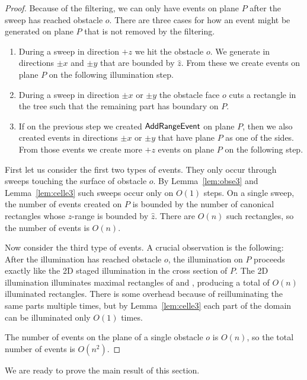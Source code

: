 \documentclass[english,gradu]{tktltiki2018}
\begin{document}
\begin{proof}
Because of the filtering, we can only have events on plane $P$ after the sweep has reached obstacle $o$.
There are three cases for how an event might be generated on plane $P$ that is not removed by the filtering.
\begin{enumerate}
\item During a sweep in direction $+z$ we hit the obstacle $o$.
	We generate \addEs in directions $\pm x$ and $\pm y$ that are bounded by $\hat{z}$.
	From these \addEs we create events on plane $P$ on the following illumination step.
\item During a sweep in direction $\pm x$ or $\pm y$ the obstacle face $o$ cuts a rectangle in the tree such that the remaining part has boundary on $P$.
\item If on the previous step we created $\mathsf{AddRangeEvent}$ on plane $P$, then we also created events in directions $\pm x$ or $\pm y$ that have plane $P$ as one of the sides.
	From those events we create more $+z$ events on plane $P$ on the following step.
\end{enumerate}

First let us consider the first two types of events.
They only occur through sweeps touching the surface of obstacle $o$.
By Lemma~\ref{lem:obse3} and Lemma~\ref{lem:celle3} such sweeps occur only on $O(1)$ steps.
On a single sweep, the number of events created on $P$ is bounded by the number of canonical rectangles whose $z$-range is bounded by $\hat{z}$.
There are $O(n)$ such rectangles, so the number of events is $O(n)$.

Now consider the third type of events.
A crucial observation is the following:
After the illumination has reached obstacle $o$, the illumination on $P$ proceeds exactly like the 2D staged illumination in the cross section of $P$.
The 2D illumination illuminates maximal rectangles of  and , producing a total of $O(n)$ illuminated rectangles.
There is some overhead because of reilluminating the same parts multiple times, but by Lemma~\ref{lem:celle3} each part of the domain can be illuminated only $O(1)$ times.

The number of events on the plane of a single obstacle $o$ is $O(n)$, so the total number of events is $O(n^2)$.
\end{proof}

We are ready to prove the main result of this section.
\end{document}
